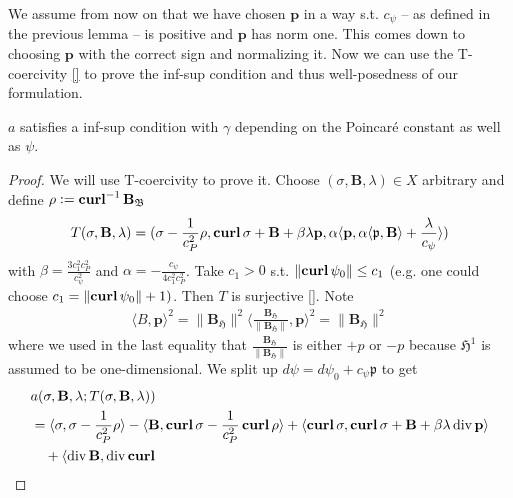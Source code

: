 \documentclass[../master_thesis.tex]{subfiles}
\begin{document}
We assume from now on that we have chosen $\mathbf{p}$ in a way s.t. 
$c_\psi$ -- as defined in the previous lemma -- is positive and $\mathbf{p}$ has 
norm one. This comes down to choosing $\mathbf{p}$ with the correct sign and normalizing it. 
Now we can use the T-coercivity \ref{} to prove the inf-sup condition and thus 
well-posedness of our formulation.

\begin{theorem}
    $a$ satisfies a inf-sup condition with $\gamma$ depending on the Poincaré constant 
    as well as $\psi$.
\end{theorem}
\begin{proof}
    We will use T-coercivity to prove it. Choose $(\sigma, \mathbf{B},\lambda) \in X$ 
    arbitrary and define $\rho \vcentcolon= \veccurl^{-1} \mathbf{B}_{\mathfrak{B}}$
    \begin{align*}
        T(\sigma, \mathbf{B},\lambda)
        = (\sigma - \frac{1}{c_P^2}\rho, \veccurl \sigma + \mathbf{B} + \beta \lambda\mathbf{p},
            \alpha \langle \mathbf{p}, \alpha \langle \mathfrak{p}, \mathbf{B} \rangle  + \frac{\lambda}{c_\psi} \rangle)
    \end{align*}
    with $\beta = \frac{3 c_1^2 c_P^2}{c_\psi^2}$ and $\alpha = -\frac{c_\psi}{4 c_1^2 c_P^2}$.
    Take $c_1 > 0$ s.t. $\lVert \veccurl \psi_0 \rVert \leq c_1$ (e.g. one could choose 
    $c_1 = \lVert \veccurl \psi_0 \rVert + 1)$.
    Then $T$ is surjective \ref{}. 
    Note 
    \begin{align*}
        \langle B, \mathbf{p} \rangle ^ 2
        = \lVert \mathbf{B}_\mathfrak{H} \rVert^2  
            \langle \frac{\mathbf{B}_\mathfrak{H}}{\lVert \mathbf{B}_\mathfrak{H} \rVert}, \mathbf{p} \rangle ^ 2
        = \lVert \mathbf{B}_\mathfrak{H} \rVert^2
    \end{align*}
    where we used in the last equality that $\frac{\mathbf{B}_\mathfrak{H}}{\lVert \mathbf{B}_\mathfrak{H} \rVert}$
    is either $+p$ or $-p$ because $\mathfrak{H}^1$ is assumed to be one-dimensional.
    We split up $d\psi = d\psi_0 + c_\psi \mathfrak{p}$ to get 
    \begin{align*}
        &a(\sigma, \mathbf{B},\lambda;T(\sigma, \mathbf{B},\lambda))
        \\ &=\langle \sigma, \sigma - \frac{1}{c_P^2} \rho \rangle 
            - \langle \mathbf{B}, \veccurl \sigma - \frac{1}{c_P^2}\veccurl \rho \rangle
            + \langle \veccurl \sigma , \veccurl \sigma + \mathbf{B} + \beta \lambda \diver \mathbf{p} \rangle
        \\ &\quad + \langle \diver \mathbf{B}, \diver \veccurl 

\end{align*}
\end{proof}
\end{document}
